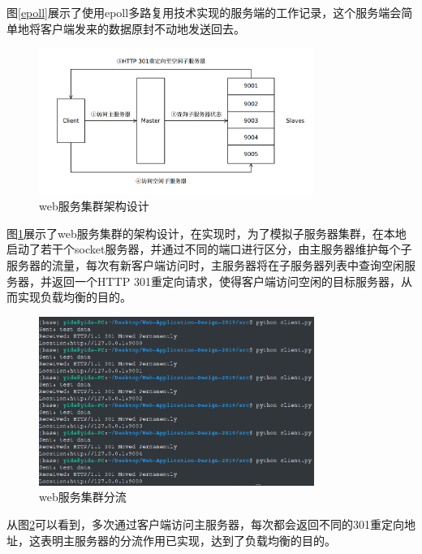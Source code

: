\documentclass{article}
\begin{document}
图\ref{epoll}展示了使用epoll多路复用技术实现的服务端的工作记录，这个服务端会简单地将客户端发来的数据原封不动地发送回去。

\begin{figure}[ht]
    \centering
    \includegraphics[width=0.8\textwidth]{img/架构设计.png}
    \caption{web服务集群架构设计}
    \label{web}
\end{figure}

图\ref{web}展示了web服务集群的架构设计，在实现时，为了模拟子服务器集群，在本地启动了若干个socket服务器，并通过不同的端口进行区分，由主服务器维护每个子服务器的流量，每次有新客户端访问时，主服务器将在子服务器列表中查询空闲服务器，并返回一个HTTP 301重定向请求，使得客户端访问空闲的目标服务器，从而实现负载均衡的目的。

\begin{figure}[ht]
    \centering
    \includegraphics[width=0.8\textwidth]{img/master.png}
    \caption{web服务集群分流}
    \label{master}
\end{figure}

从图\ref{master}可以看到，多次通过客户端访问主服务器，每次都会返回不同的301重定向地址，这表明主服务器的分流作用已实现，达到了负载均衡的目的。
\end{document}
